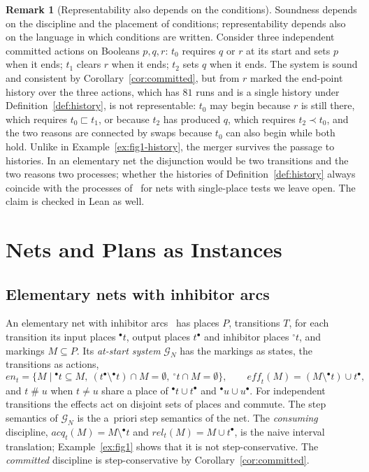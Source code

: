 \documentclass[preprint,12pt]{elsarticle}
\theoremstyle{plain}
\theoremstyle{definition}
\newtheorem{remark}[theorem]{Remark}
\newcommand{\en}{\mathit{en}}
\newcommand{\eff}{\mathit{eff}}
\newcommand{\acq}{\mathit{acq}}
\newcommand{\rel}{\mathit{rel}}
\newcommand{\conf}{\mathrel{\#}}
\newcommand{\G}{\mathcal{G}}
\newcommand{\wprec}{\sqsubset}
\begin{document}
\begin{remark}[Representability also depends on the conditions]
\label{rem:disjunctive}
Soundness depends on the discipline and the placement of conditions; representability depends also on the language in which conditions are written. Consider three independent committed actions on Booleans $p, q, r$: $t_0$ requires $q$ or $r$ at its start and sets $p$ when it ends; $t_1$ clears $r$ when it ends; $t_2$ sets $q$ when it ends. The system is sound and consistent by Corollary~\ref{cor:committed}, but from $r$ marked the end-point history over the three actions, which has $81$ runs and is a single history under Definition~\ref{def:history}, is not representable: $t_0$ may begin because $r$ is still there, which requires $t_0 \wprec t_1$, or because $t_2$ has produced $q$, which requires $t_2 \prec t_0$, and the two reasons are connected by swaps because $t_0$ can also begin while both hold. Unlike in Example~\ref{ex:fig1-history}, the merger survives the passage to histories. In an elementary net the disjunction would be two transitions and the two reasons two processes; whether the histories of Definition~\ref{def:history} always coincide with the processes of~\cite{AlqarniJanicki2018} for nets with single-place tests we leave open. The claim is checked in Lean as well.
\end{remark}

\section{Nets and Plans as Instances}
\label{sec:nets}

\subsection{Elementary nets with inhibitor arcs}

An elementary net with inhibitor arcs~\cite{JanickiKoutny1995} has places $P$, transitions $T$, for each transition its input places ${}^\bullet t$, output places $t^\bullet$ and inhibitor places ${}^\circ t$, and markings $M \subseteq P$. Its \emph{at-start system} $\G_N$ has the markings as states, the transitions as actions,
\[
\en_t = \{ M \mid {}^\bullet t \subseteq M,\ (t^\bullet \setminus {}^\bullet t) \cap M = \emptyset,\ {}^\circ t \cap M = \emptyset \},\qquad
\eff_t(M) = (M \setminus {}^\bullet t) \cup t^\bullet ,
\]
and $t \conf u$ when $t \neq u$ share a place of ${}^\bullet t \cup t^\bullet$ and ${}^\bullet u \cup u^\bullet$. For independent transitions the effects act on disjoint sets of places and commute. The step semantics of $\G_N$ is the a~priori step semantics of the net. The \emph{consuming} discipline, $\acq_t(M) = M \setminus {}^\bullet t$ and $\rel_t(M) = M \cup t^\bullet$, is the naive interval translation; Example~\ref{ex:fig1} shows that it is not step-conservative. The \emph{committed} discipline is step-conservative by Corollary~\ref{cor:committed}.
\end{document}
